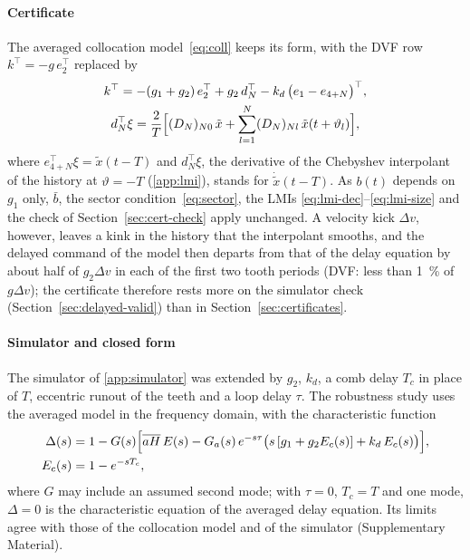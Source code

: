 \paragraph{Certificate}
The averaged collocation model~\eqref{eq:coll} keeps its form, with the DVF row $k^\top=-g\,e_2^\top$ replaced by
\begin{equation*}
  \begin{gathered}
    k^\top=-(g_1+g_2)\,e_2^\top+g_2\,d_N^\top-k_d\,\bigl(e_1-e_{4+N}\bigr)^\top,\\
    d_N^\top\xi=\frac2T\Bigl[(D_N)_{N0}\,\tilde x+\sum_{l=1}^{N}(D_N)_{Nl}\,\tilde x(t+\vartheta_l)\Bigr],
  \end{gathered}
\end{equation*}
where $e_{4+N}^\top\xi=\tilde x(t-T)$ and $d_N^\top\xi$, the derivative of the Chebyshev interpolant of the history at $\vartheta=-T$ (\ref{app:lmi}), stands for $\dot{\tilde x}(t-T)$. As $b(t)$ depends on $g_1$ only, $\bar b$, the sector condition~\eqref{eq:sector}, the LMIs \eqref{eq:lmi-dec}--\eqref{eq:lmi-size} and the check of Section~\ref{sec:cert-check} apply unchanged. A velocity kick $\Delta v$, however, leaves a kink in the history that the interpolant smooths, and the delayed command of the model then departs from that of the delay equation by about half of $g_2\Delta v$ in each of the first two tooth periods (DVF: less than \SI{1}{\percent} of $g\Delta v$); the certificate therefore rests more on the simulator check (Section~\ref{sec:delayed-valid}) than in Section~\ref{sec:certificates}.

\paragraph{Simulator and closed form}
The simulator of \ref{app:simulator} was extended by $g_2$, $k_d$, a comb delay $T_c$ in place of $T$, eccentric runout of the teeth and a loop delay $\tau$. The robustness study uses the averaged model in the frequency domain, with the characteristic function
\begin{equation}\label{eq:comb-char}
  \begin{aligned}
    \Delta(s)&=1-G(s)\Bigl[\overline{aH}\,E(s)-G_a(s)\,e^{-s\tau}\bigl(s\,[g_1+g_2E_c(s)]+k_d\,E_c(s)\bigr)\Bigr],\\
    E_c(s)&=1-e^{-sT_c},
  \end{aligned}
\end{equation}
where $G$ may include an assumed second mode; with $\tau=0$, $T_c=T$ and one mode, $\Delta=0$ is the characteristic equation of the averaged delay equation. Its limits agree with those of the collocation model and of the simulator (Supplementary Material).

